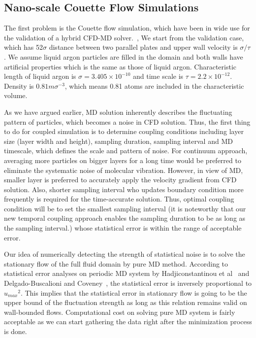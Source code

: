 \documentclass[conference,final]{IEEEtran}
\begin{document}
\subsection{Nano-scale Couette Flow Simulations}

The first problem is the Couette flow simulation, which have been in wide use for the validation of a hybrid CFD-MD solver.~\cite{Nie},\cite{Yen} We start from the validation case, which has 52$\sigma$ distance between two parallel plates and upper wall velocity is ${\sigma}/{\tau}$. We assume liquid argon particles are filled in the domain and both walls have artificial properties which is the same as those of liquid argon. Characteristic length of liquid argon is ${\sigma}=3.405{\times}10^{-10}$ and time scale is $\tau=2.2{\times}10^{-12}$. Density is $0.81m{\sigma}^{-3}$, which means 0.81 atoms are included in the characteristic volume.

As we have argued earlier, MD solution inherently describes the fluctuating pattern of particles, which becomes a noise in CFD solution. Thus, the first thing to do for coupled simulation is to determine coupling conditions including layer size (layer width and height), sampling duration, sampling interval and MD timescale, which defines the scale and pattern of noise. For continuum approach, averaging more particles on bigger layers for a long time would be preferred to eliminate the systematic noise of molecular vibration. However, in view of MD, smaller layer is preferred to accurately apply the velocity gradient from CFD solution. Also, shorter sampling interval who updates boundary condition more frequently is required for the time-accurate solution. Thus, optimal coupling condition will be to set the smallest sampling interval (it is noteworthy that our new temporal coupling approach enables the sampling duration to be as long as the sampling interval.) whose statistical error is within the range of acceptable error.

Our idea of numerically detecting the strength of statistical noise is to solve the stationary flow of the full fluid domain by pure MD method. According to statistical error analyses on periodic MD system by Hadjiconstantinou et al~\cite{Hadjicon2} and Delgado-Buscalioni and Coveney~\cite{Time_Mechanism}, the statistical error is inversely proportional to ${u_{max}}^2$. This implies that the statistical error in stationary flow is going to be the upper bound of the fluctuation strength as long as this relation remains valid on wall-bounded flows. Computational cost on solving pure MD system is fairly acceptable as we can start gathering the data right after the minimization process is done.
\end{document}
